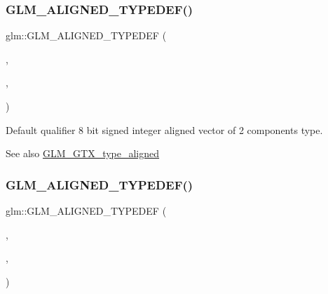 \subsubsection{\texorpdfstring{G\+L\+M\+\_\+\+A\+L\+I\+G\+N\+E\+D\+\_\+\+T\+Y\+P\+E\+D\+E\+F()}{GLM\_ALIGNED\_TYPEDEF()}\hspace{0.1cm}{\footnotesize\ttfamily [54/209]}}
{\footnotesize\ttfamily glm\+::\+G\+L\+M\+\_\+\+A\+L\+I\+G\+N\+E\+D\+\_\+\+T\+Y\+P\+E\+D\+EF (\begin{DoxyParamCaption}\item[{\mbox{\hyperlink{group__gtc__type__precision_gade57e4b55fe2b2345a4f2ac2b149cd32}{i8vec2}}}]{,  }\item[{aligned\+\_\+i8vec2}]{,  }\item[{2}]{ }\end{DoxyParamCaption})}

Default qualifier 8 bit signed integer aligned vector of 2 components type. \begin{DoxySeeAlso}{See also}
\mbox{\hyperlink{group__gtx__type__aligned}{G\+L\+M\+\_\+\+G\+T\+X\+\_\+type\+\_\+aligned}} 
\end{DoxySeeAlso}
\mbox{\label{group__gtx__type__aligned_ga2958f907719d94d8109b562540c910e2}} 
\subsubsection{\texorpdfstring{G\+L\+M\+\_\+\+A\+L\+I\+G\+N\+E\+D\+\_\+\+T\+Y\+P\+E\+D\+E\+F()}{GLM\_ALIGNED\_TYPEDEF()}\hspace{0.1cm}{\footnotesize\ttfamily [55/209]}}
{\footnotesize\ttfamily glm\+::\+G\+L\+M\+\_\+\+A\+L\+I\+G\+N\+E\+D\+\_\+\+T\+Y\+P\+E\+D\+EF (\begin{DoxyParamCaption}\item[{\mbox{\hyperlink{group__gtc__type__precision_ga9babb834daa1f84c23821bd21669c2e8}{i8vec3}}}]{,  }\item[{aligned\+\_\+i8vec3}]{,  }\item[{4}]{ }\end{DoxyParamCaption})}

